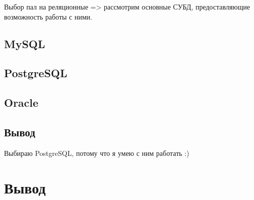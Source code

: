 Выбор пал на реляционные => рассмотрим основные СУБД, предоставляющие
возможность работы с ними.

\subsection{MySQL}

\subsection{PostgreSQL}

\subsection{Oracle}

\subsection*{Вывод}

Выбираю PostgreSQL, потому что я умею с ним работать :)

\section*{Вывод}
